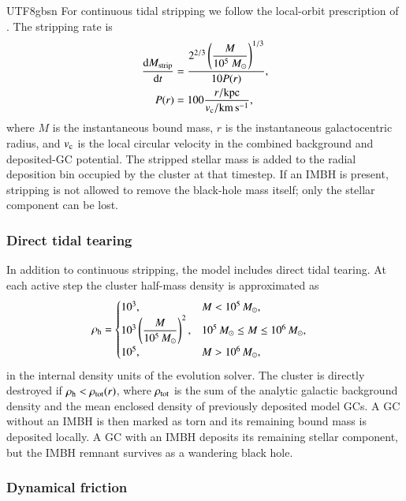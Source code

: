 \documentclass[trackchanges, twocolappendix, twocolumn]{aastex701}
\begin{document}
\begin{CJK*}{UTF8}{gbsn}
For continuous tidal stripping we follow the local-orbit prescription of \cite{Fragione+2019GC}. The stripping rate is
\begin{align}
\dfrac{\mathrm{d} M_{\rm strip}}{\mathrm{d} t} & = \dfrac{2^{2 / 3} \left( \dfrac{M}{10^5~M_\odot} \right)^{1 / 3}}{10 P(r)} , \\
P (r) & = 100 \dfrac{r / {\rm kpc}}{v_{\rm c} / {\rm km\,s^{-1}}},
\label{eq:tidal_stripping}
\end{align}
where $M$ is the instantaneous bound mass, $r$ is the instantaneous galactocentric radius, and $v_{\rm c}$ is the local circular velocity in the combined background and deposited-GC potential. The stripped stellar mass is added to the radial deposition bin occupied by the cluster at that timestep. If an IMBH is present, stripping is not allowed to remove the black-hole mass itself; only the stellar component can be lost.

\subsubsection{Direct tidal tearing} \label{subsubsect:direct_tidal_tearing}

In addition to continuous stripping, the model includes direct tidal tearing. At each active step the cluster half-mass density is approximated as
\begin{align}
\rho_{\rm h} & =
\begin{cases}
10^3, & M < 10^5\,M_\odot,\\
10^3 \left(\dfrac{M}{10^5\,M_\odot}\right)^2, & 10^5\,M_\odot \le M \le 10^6\,M_\odot,\\
10^5, & M > 10^6\,M_\odot,
\end{cases}
\label{eq:cluster_density}
\end{align}
in the internal density units of the evolution solver. The cluster is directly destroyed if $\rho_{\rm h} < \rho_{\rm tot}(r)$, where $\rho_{\rm tot}$ is the sum of the analytic galactic background density and the mean enclosed density of previously deposited model GCs. A GC without an IMBH is then marked as torn and its remaining bound mass is deposited locally. A GC with an IMBH deposits its remaining stellar component, but the IMBH remnant survives as a wandering black hole.

\subsubsection{Dynamical friction} \label{subsubsect:dynamical_friction}


\end{CJK*}
\end{document}
